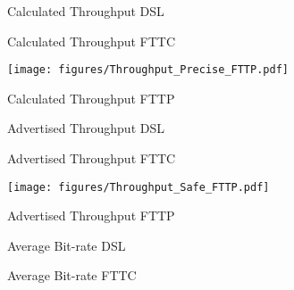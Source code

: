 \documentclass[10pt,sigconf]{acmart}
\begin{document}

\begin{figure}
    \centering
    \caption{Calculated Throughput DSL}
    \label{fig:throughput-precise-DSL}
\end{figure}

\begin{figure}
    \centering
    \caption{Calculated Throughput FTTC}
    \label{fig:throughput-precise-FTTC}
\end{figure}

\begin{figure}
    \centering
    \texttt{[image: figures/Throughput\_Precise\_FTTP.pdf]}
    \caption{Calculated Throughput FTTP}
    \label{fig:throughput-precise-FTTP}
\end{figure}

\begin{figure}
    \centering
    \caption{Advertised Throughput DSL}
    \label{fig:throughput-safe-DSL}
\end{figure}

\begin{figure}
    \centering
    \caption{Advertised Throughput FTTC}
    \label{fig:throughput-safe-FTTC}
\end{figure}

\begin{figure}
    \centering
    \texttt{[image: figures/Throughput\_Safe\_FTTP.pdf]}
    \caption{Advertised Throughput FTTP}
    \label{fig:throughput-safe-FTTP}
\end{figure}

\begin{figure}
    \centering
    \caption{Average Bit-rate DSL}
    \label{fig:avg-bitrate-DSL}
\end{figure}

\begin{figure}
    \centering
    \caption{Average Bit-rate FTTC}
    \label{fig:avg-bitrate-FTTC}
\end{figure}
\end{document}
